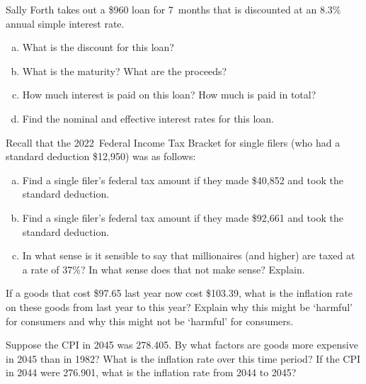 \documentclass[11pt,letterpaper]{article}
\begin{document}

 Sally Forth takes out a \$960 loan for 7~months that is discounted at an 8.3\% annual simple interest rate.
	\begin{enumerate}[(a)]
	\item What is the discount for this loan?
	\item What is the maturity? What are the proceeds?
	\item How much interest is paid on this loan? How much is paid in total?
	\item Find the nominal and effective interest rates for this loan.
	\end{enumerate}



\newpage



 Recall that the 2022~Federal Income Tax Bracket for single filers (who had a standard deduction \$12,950) was as follows:
	\begin{table}[!ht]
	\centering
	\end{table}

	\begin{enumerate}[(a)]
	\item Find a single filer's federal tax amount if they made \$40,852 and took the standard deduction. 
	\item Find a single filer's federal tax amount if they made \$92,661 and took the standard deduction. 
	\item In what sense is it sensible to say that millionaires (and higher) are taxed at a rate of 37\%? In what sense does that not make sense? Explain.
	\end{enumerate}



\newpage



 If a goods that cost \$97.65 last year now cost \$103.39, what is the inflation rate on these goods from last year to this year? Explain why this might be `harmful' for consumers and why this might not be `harmful' for consumers. 



\newpage



 Suppose the CPI in 2045 was 278.405. By what factors are goods more expensive in 2045 than in 1982? What is the inflation rate over this time period? If the CPI in 2044 were 276.901, what is the inflation rate from 2044 to 2045?
\end{document}

